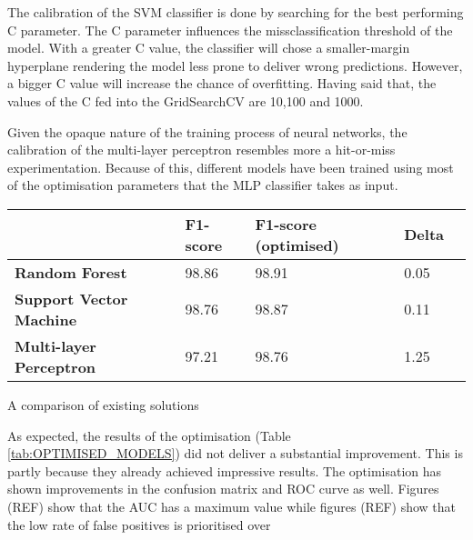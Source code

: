 The calibration of the SVM classifier is done by searching for the best performing C parameter. The C parameter influences the missclassification threshold of the model. With a greater C value, the classifier will chose a smaller-margin hyperplane rendering the model less prone to deliver wrong predictions. However, a bigger C value will increase the chance of overfitting. Having said that, the values of the C fed into the GridSearchCV are 10,100 and 1000.

Given the opaque nature of the training process of neural networks, the calibration of the multi-layer perceptron resembles more a hit-or-miss experimentation. Because of this, different models have been trained using most of the optimisation parameters that the MLP classifier takes as input.

\begin{singlespace}
	\small
	\begin{center}
		\label{tab:OPTIMISED_MODELS}
		\begin{tabular}{ | m{8em} | m{13em} | m{8.5em} | m{2.3em} | m{5em} | }
			\hline
			                                & \textbf{F1-score} & \textbf{F1-score (optimised)} & \textbf{Delta}\\ 
			\hline
			\textbf{Random Forest}          & 98.86  & 98.91  & 0.05         \\
			\hline
			\textbf{Support Vector Machine} & 98.76  &98.87   & 0.11       \\
			\hline
			\textbf{Multi-layer Perceptron} & 97.21   & 98.76  & 1.25        \\
			\hline
		\end{tabular}
		\captionsetup{type=table}\caption{A comparison of existing solutions \citep{INTELLIGENT_PHISHING_ANFIS}}
	\end{center}
\end{singlespace}

As expected, the results of the optimisation (Table \ref{tab:OPTIMISED_MODELS}) did not deliver a substantial improvement. This is partly because they already achieved impressive results. The optimisation has shown improvements in the confusion matrix and ROC curve as well. Figures (REF) show that the AUC has a maximum value while figures (REF) show that the low rate of false positives is prioritised over 














